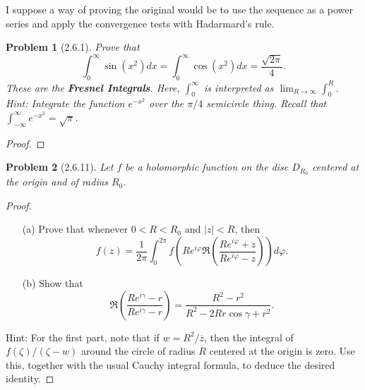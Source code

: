 \documentclass[10pt]{article}
\newcommand{\sk}{\vskip 10mm}
\newcommand{\conj}[1]{\overline{#1}}
\theoremstyle{plain}
\newtheorem{problem}{Problem}
\theoremstyle{remark}
\begin{document}
I suppose a way of proving the original would be to use the sequence
as a power series and apply the convergence tests with Hadarmard's rule.

\sk

\begin{problem}[2.6.1]
  Prove that
  \[
    \int_0^\infty\sin(x^2)dx=\int_0^\infty\cos(x^2)dx=\frac{\sqrt{2\pi}}{4}.
  \]
  These are the \textbf{Fresnel Integrals}. Here, $\int_0^\infty$ is
  interpreted as $\lim_{R\rightarrow\infty}\int_0^R$.\\
  Hint: Integrate the function $e^{-x^2}$ over the $\pi/4$ semicircle
  thing. Recall that $\int_{-\infty}^\infty e^{-x^2}=\sqrt{\pi}$.
\end{problem}

\begin{proof}
  
\end{proof}

\sk

\begin{problem}[2.6.11]
  Let $f$ be a holomorphic function on the disc $D_{R_0}$ centered at the
  origin and of radius $R_0$.
\end{problem}

\begin{proof}
  \begin{itemize}
  \item[(a)] Prove that whenever $0<R<R_0$ and $|z|<R$, then
    \[
      f(z)=\frac{1}{2\pi}\int_0^{2\pi}f(Re^{i\varphi}\Re\left(\frac{Re^{i\varphi}+z}{Re^{i\varphi}-z}\right))d\varphi.
    \]
  \item[(b)] Show that
    \[
      \Re\left(\frac{Re^{i\gamma}-r}{Re^{i\gamma}-r}\right) = \frac{R^2-r^2}{R^2-2Rr\cos\gamma + r^2}.
    \]
  \end{itemize}
  Hint: For the first part, note that if $w=R^2/\conj{z}$, then the integral of
  $f(\zeta)/(\zeta-w)$ around the circle of radius $R$ centered at the origin is
  zero. Use this, together with the usual Cauchy integral formula, to deduce
  the desired identity.
\end{proof}

\end{document}
